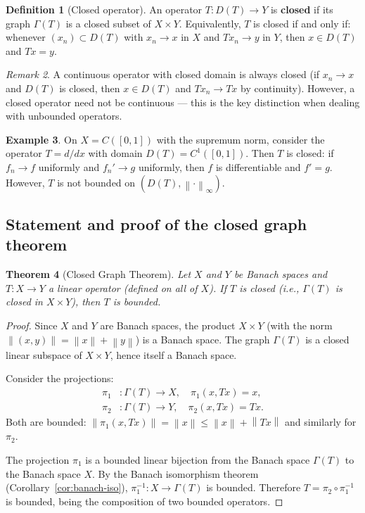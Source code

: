 \documentclass[a4paper,12pt]{book}
\newcommand{\norm}[1]{\left\| #1 \right\|}
\theoremstyle{definition}
\newtheorem{definition}{Definition}[chapter]
\newtheorem{example}[definition]{Example}
\theoremstyle{plain}
\newtheorem{theorem}[definition]{Theorem}
\theoremstyle{remark}
\newtheorem{remark}[definition]{Remark}
\begin{document}
\begin{definition}[Closed operator]\label{def:closed-operator}
An operator $T \colon D(T) \to Y$ is \textbf{closed} if its graph $\Gamma(T)$
is a closed subset of $X \times Y$. Equivalently, $T$ is closed if and only if:
whenever $(x_n) \subset D(T)$ with $x_n \to x$ in $X$ and $Tx_n \to y$ in $Y$,
then $x \in D(T)$ and $Tx = y$.
\end{definition}

\begin{remark}\label{rem:closed-vs-continuous}
A continuous operator with closed domain is always closed (if $x_n \to x$ and $D(T)$
is closed, then $x \in D(T)$ and $Tx_n \to Tx$ by continuity). However, a closed
operator need not be continuous --- this is the key distinction when dealing with
unbounded operators.
\end{remark}

\begin{example}\label{ex:differentiation-closed}
On $X = C([0,1])$ with the supremum norm, consider the operator
$T = d/dx$ with domain $D(T) = C^1([0,1])$. Then $T$ is closed: if $f_n \to f$
uniformly and $f_n' \to g$ uniformly, then $f$ is differentiable and $f' = g$.
However, $T$ is not bounded on $(D(T), \norm{\cdot}_\infty)$.
\end{example}

\subsection{Statement and proof of the closed graph theorem}

\begin{theorem}[Closed Graph Theorem]\label{thm:cgt}
Let $X$ and $Y$ be Banach spaces and $T \colon X \to Y$ a linear operator
(defined on all of $X$). If $T$ is closed (i.e., $\Gamma(T)$ is closed in
$X \times Y$), then $T$ is bounded.
\end{theorem}

\begin{proof}
Since $X$ and $Y$ are Banach spaces, the product $X \times Y$ (with the norm
$\norm{(x,y)} = \norm{x} + \norm{y}$) is a Banach space. The graph $\Gamma(T)$
is a closed linear subspace of $X \times Y$, hence itself a Banach space.

Consider the projections:
\begin{align*}
  \pi_1 &\colon \Gamma(T) \to X, \quad \pi_1(x, Tx) = x, \\
  \pi_2 &\colon \Gamma(T) \to Y, \quad \pi_2(x, Tx) = Tx.
\end{align*}
Both are bounded: $\norm{\pi_1(x,Tx)} = \norm{x} \leq \norm{x} + \norm{Tx}$
and similarly for $\pi_2$.

The projection $\pi_1$ is a bounded linear bijection from the Banach space
$\Gamma(T)$ to the Banach space $X$. By the Banach isomorphism theorem
(Corollary~\ref{cor:banach-iso}), $\pi_1^{-1} \colon X \to \Gamma(T)$ is bounded.
Therefore $T = \pi_2 \circ \pi_1^{-1}$ is bounded, being the composition of two
bounded operators.
\end{proof}
\end{document}

